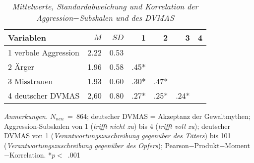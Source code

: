 \begin{table}[htb]
    \caption[Mittelwerte, Standardabweichung und Korrelation der Aggression$-$Subskalen und des DVMAS]{\textit {Mittelwerte, Standardabweichung und Korrelation der Aggression$-$Subskalen und des DVMAS}} 
    \label{lala}
    \centering
    \begin{adjustbox}{width=11cm} %
    \small
    \begin{tabular}{lrrrrrr}
      \hline
        Variablen & $M$ & $SD$ & 1 & 2 & 3 & 4 \\
       \hline
       1 verbale Aggression & 2.22 & 0.53 &      &      &      & \\
       2 Ärger              & 1.96 & 0.58 & .45* &      &      & \\
       3 Misstrauen         & 1.93 & 0.60 & .30* & .47* &      & \\
       4 deutscher DVMAS    & 2,60 & 0.80 & .27* & .25* & .24* & \\
    \end{tabular}
    \end{adjustbox}
    
    \begin{tablenotes}
        \item \textit{Anmerkungen.} \( N_{neu} \)~=~864; deutscher DVMAS = Akzeptanz der Gewaltmythen; Aggression-Subskalen von 1 (\textit{trifft nicht zu}) bis 4 (\textit{trifft voll zu}); deutscher DVMAS von 1 (\textit{Verantwortungszuschreibung gegenüber des Täters}) bis 101 (\textit{Verantwortungszuschreibung gegenüber des Opfers}); Pearson$-$Produkt$-$Moment$-$Korrelation. *$p<$~.001
      \end{tablenotes}
    \end{table}


